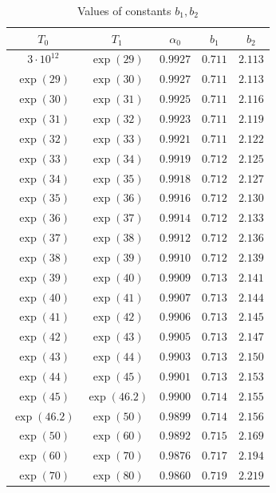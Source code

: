 \documentclass[reqno]{amsart}
\numberwithin{equation}{section}
\theoremstyle{remark}
\begin{document}
\begin{table}[h]
\def\arraystretch{1.3}
\centering
\caption{Values of constants $b_1,b_2$ }
\begin{tabular}{|c|c|c|c|c|}
\hline
$T_0$ & $T_1$ & $\alpha_0$ & $b_1$ & $b_2$   \\
\hline
$3\cdot 10^{12} $ & $\exp(29)$ & $0.9927$ & $0.711$ & $2.113$\\
\hline
$\exp(29)$ & $\exp(30)$ & $0.9927$ & $0.711$ & $2.113$\\
\hline
$\exp(30)$ & $\exp(31)$ & $0.9925$ & $0.711$ & $2.116$\\
\hline
$\exp(31)$ & $\exp(32)$ & $0.9923$ & $0.711$ & $2.119$\\
\hline
$\exp(32)$ & $\exp(33)$ & $0.9921$ & $0.711$ & $2.122$\\
\hline
$\exp(33)$ & $\exp(34)$ & $0.9919$ & $0.712$ & $2.125$\\
\hline
$\exp(34)$ & $\exp(35)$ & $0.9918$ & $0.712$ & $2.127$\\
\hline
$\exp(35)$ & $\exp(36)$ & $0.9916$ & $0.712$ & $2.130$\\
\hline
$\exp(36)$ & $\exp(37)$ & $0.9914$ & $0.712$ & $2.133$\\
\hline
$\exp(37)$ & $\exp(38)$ & $0.9912$ & $0.712$ & $2.136$\\
\hline
$\exp(38)$ & $\exp(39)$ & $0.9910$ & $0.712$ & $2.139$\\
\hline
$\exp(39)$ & $\exp(40)$ & $0.9909$ & $0.713$ & $2.141$\\
\hline
$\exp(40)$ & $\exp(41)$ & $0.9907$ & $0.713$ & $2.144$\\
\hline
$\exp(41)$ & $\exp(42)$ & $0.9906$ & $0.713$ & $2.145$\\
\hline
$\exp(42)$ & $\exp(43)$ & $0.9905$ & $0.713$ & $2.147$\\
\hline
$\exp(43)$ & $\exp(44)$ & $0.9903$ & $0.713$ & $2.150$\\
\hline
$\exp(44)$ & $\exp(45)$ & $0.9901$ & $0.713$ & $2.153$\\
\hline
$\exp(45)$ & $\exp(46.2)$ & $0.9900$ & $0.714$ & $2.155$\\
\hline
$\exp(46.2)$ & $\exp(50)$ & $0.9899 $ & $0.714 $ & $2.156 $\\
\hline
$\exp(50)$ & $\exp(60)$ & $0.9892 $ & $0.715 $ & $2.169 $\\
\hline
$\exp(60)$ & $\exp(70)$ & $0.9876 $ & $0.717 $ & $2.194 $\\
\hline
$\exp(70)$ & $\exp(80)$ & $0.9860 $ & $0.719$ & $2.219$\\

\end{tabular}
\end{table}
\end{document}
